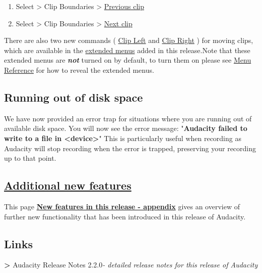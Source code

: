 \begin{multicols}{2}
\begin{enumerate}
\item Select > Clip Boundaries > 
\hyperref[\foo{select_menu_clip_boundaries_previous_clip}]{Previous clip}

\item Select > Clip Boundaries > 
\hyperref[\foo{select_menu_clip_boundaries_next_clip}]{Next clip}

\end{enumerate}
There are also two new commands (
\hyperref[\foo{ext_command_menu_cursor_clip_left}]{Clip Left}
 and 
\hyperref[\foo{ext_command_menu_cursor_clip_right}]{Clip Right}
) for moving clips, which are available in the 
\hyperref[\foo{new_features_in_this_release__extendedmenubar}]{extended menus}
 added in this release.Note that these extended menus are \textit{\textbf{not}} turned on by default, to turn them on please see 
\hyperref[\foo{menu_reference_the_extended_menu_bar}]{Menu Reference}
 for how to reveal the extended menus.
\label{new_features_in_this_release_safety}
\subsection{Running out of disk space}We have now provided an error trap for situations where you are running out of available disk space.
You will now see the error message:
"\textbf{Audacity failed to write to a file in <device>}"
This is particularly useful when recording as Audacity will stop recording when the error is trapped, preserving your recording up to that point.

\label{new_features_in_this_release_appendix}
\subsection{
\hyperref[\foo{new_features_in_this_release_appendix_}]{Additional new features}
}This page \textbf{
\hyperref[\foo{new_features_in_this_release_appendix_}]{New features in this release - appendix}
} gives an overview of further new functionality that has been introduced in this release of Audacity.

\subsection{Links}\textbf{>} Audacity Release Notes 2.2.0\textit{- detailed release notes for this release of Audacity}\end{multicols}